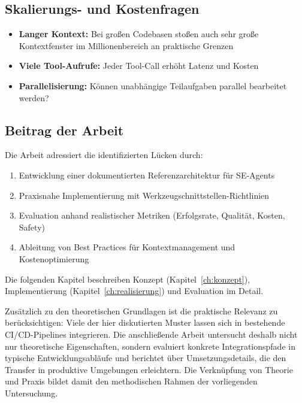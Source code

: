 \subsection{Skalierungs- und Kostenfragen}

\begin{itemize}
  \item \textbf{Langer Kontext:} Bei großen Codebasen stoßen auch sehr große Kontextfenster im Millionenbereich an praktische Grenzen~\cite{meta2025llama4}
  \item \textbf{Viele Tool-Aufrufe:} Jeder Tool-Call erhöht Latenz und Kosten
  \item \textbf{Parallelisierung:} Können unabhängige Teilaufgaben parallel bearbeitet werden?
\end{itemize}

\subsection{Beitrag der Arbeit}

Die Arbeit adressiert die identifizierten Lücken durch:

\begin{enumerate}
  \item Entwicklung einer dokumentierten Referenzarchitektur für SE-Agents
  \item Praxisnahe Implementierung mit Werkzeugschnittstellen-Richtlinien
  \item Evaluation anhand realistischer Metriken (Erfolgsrate, Qualität, Kosten, Safety)
  \item Ableitung von Best Practices für Kontextmanagement und Kostenoptimierung
\end{enumerate}

Die folgenden Kapitel beschreiben Konzept (Kapitel~\ref{ch:konzept}), Implementierung (Kapitel~\ref{ch:realisierung}) und Evaluation im Detail.

Zusätzlich zu den theoretischen Grundlagen ist die praktische Relevanz zu berücksichtigen: Viele der hier diskutierten Muster lassen sich in bestehende CI/CD-Pipelines integrieren. Die anschließende Arbeit untersucht deshalb nicht nur theoretische Eigenschaften, sondern evaluiert konkrete Integrationspfade in typische Entwicklungsabläufe und berichtet über Umsetzungsdetails, die den Transfer in produktive Umgebungen erleichtern. Die Verknüpfung von Theorie und Praxis bildet damit den methodischen Rahmen der vorliegenden Untersuchung.
